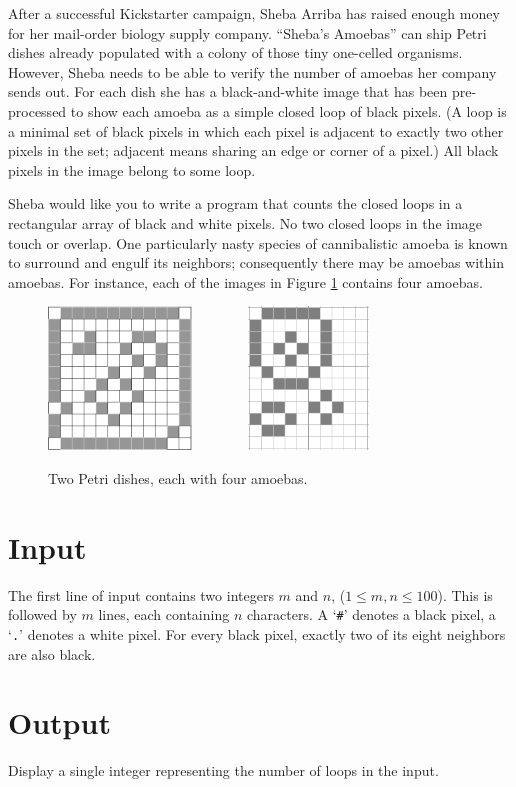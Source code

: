 After a successful Kickstarter campaign, Sheba Arriba has raised
enough money for her mail-order biology supply company.
``Sheba's Amoebas'' can ship Petri dishes already populated with
a colony of those tiny one-celled organisms. However, Sheba
needs to be able to verify the number of amoebas her company sends out.
For each dish she has a black-and-white image that has been
pre-processed to show each amoeba as a simple closed
loop of black pixels. (A loop is a minimal set of black pixels in which
each pixel is adjacent to exactly two other pixels in the set; adjacent means
sharing an edge or corner of a pixel.) All black pixels in the image
belong to some loop.

Sheba would like you
to write a program that counts the closed loops in a rectangular array
of black and white pixels.
No two closed loops in the image touch or overlap.
One particularly nasty species of cannibalistic amoeba is known to surround
and engulf its neighbors; consequently there may be amoebas within amoebas.
For instance, each of the images in Figure \ref{amoeba fig 1}
contains four amoebas.

\vspace{-2pt}
\begin{figure}[!h]
\centering
  \includegraphics[height=1.5in]{12by12sample}\ \ \ \ \ \ \ \
  \includegraphics[height=1.5in]{12by10sample}
  \vspace{-3pt}%
  \caption{Two Petri dishes, each with four amoebas.}
  \label{amoeba fig 1}
\end{figure}

\vspace{-2pt}
\section*{Input}
The first line of input contains two integers $m$ and $n$,
($1 \leq m,n \leq 100$).
This is followed by $m$ lines, each containing $n$ characters. A
`\texttt{\#}' denotes a black pixel, a `\texttt{.}' denotes a white pixel.
For every black pixel, exactly two of its eight neighbors are also black.

\section*{Output}
Display a single integer representing the number of loops in the input.
